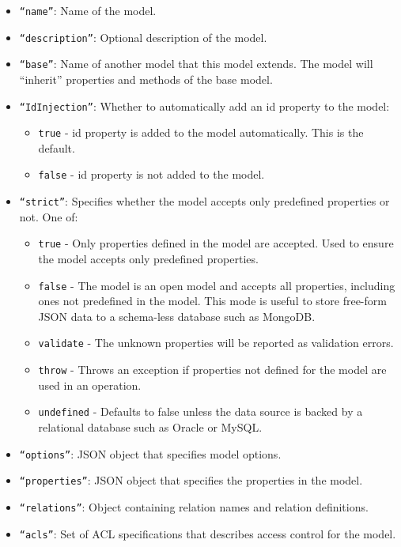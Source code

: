 \begin{itemize}
\item \texttt{``name''}: Name of the model.

\item \texttt{``description''}: Optional description of the model.

\item \texttt{``base''}: Name of another model that this model extends. The model will ``inherit'' properties and methods of the base model.

\item \texttt{``IdInjection''}: Whether to automatically add an id property to the model:
\begin{itemize}
\item \texttt{true} - id property is added to the model automatically. This is the default.
\item \texttt{false} - id property is not added to the model.
\end{itemize}

\item \texttt{``strict''}: Specifies whether the model accepts only predefined properties or not. One of:
\begin{itemize}
\item \texttt{true} - Only properties defined in the model are accepted. Used to ensure the model accepts only predefined properties.
\item \texttt{false} - The model is an open model and accepts all properties, including ones not predefined in the model. This mode is useful to store free-form JSON data to a schema-less database such as MongoDB.
\item \texttt{validate} - The unknown properties will be reported as validation errors.
\item \texttt{throw} - Throws an exception if properties not defined for the model are used in an operation.
\item \texttt{undefined} - Defaults to false unless the data source is backed by a relational database such as Oracle or MySQL.
\end{itemize}

\item \texttt{``options''}: JSON object that specifies model options.

\item \texttt{``properties''}: JSON object that specifies the properties in the model.

\item \texttt{``relations''}: Object containing relation names and relation definitions.

\item \texttt{``acls''}: Set of ACL specifications that describes access control for the model.

\end{itemize}

